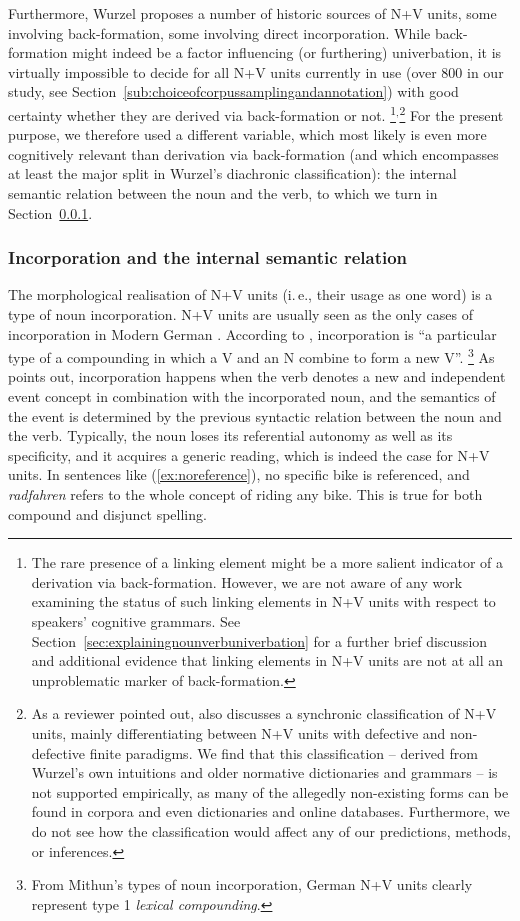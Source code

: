 \documentclass[biblatex, charis, linguex]{glossa}\usepackage{knitr}
\newcommand{\Up}[1]{\ensuremath{^{\text{#1}}}}
\begin{document}
Furthermore, Wurzel proposes a number of historic sources of N+V units, some involving back-formation, some involving direct incorporation.
While back-formation might indeed be a factor influencing (or furthering) univerbation, it is virtually impossible to decide for all N+V units currently in use (over 800 in our study, see Section~\ref{sub:choiceofcorpussamplingandannotation}) with good certainty whether they are derived via back-formation or not.%
\footnote{The rare presence of a linking element might be a more salient indicator of a derivation via back-formation.
However, we are not aware of any work examining the status of such linking elements in N+V units with respect to speakers' cognitive grammars.
See Section~\ref{sec:explainingnounverbuniverbation} for a further brief discussion and additional evidence that linking elements in N+V units are not at all an unproblematic marker of back-formation.%
}\Up{,}\footnote{%
As a reviewer pointed out, \citet{Wurzel1998} also discusses a synchronic classification of N+V units, mainly differentiating between N+V units with defective and non-defective finite paradigms.
We find that this classification -- derived from Wurzel's own intuitions and older normative dictionaries and grammars -- is not supported empirically, as many of the allegedly non-existing forms can be found in corpora and even dictionaries and online databases.
Furthermore, we do not see how the classification would affect any of our predictions, methods, or inferences.}
For the present purpose, we therefore used a different variable, which most likely is even more cognitively relevant than derivation via back-formation (and which encompasses at least the major split in Wurzel's diachronic classification): the internal semantic relation between the noun and the verb, to which we turn in Section~\ref{sub:incorporation}.

\subsubsection{Incorporation and the internal semantic relation}
\label{sub:incorporation}

The morphological realisation of N+V units (i.\,e., their usage as one word) is a type of noun incorporation.
N+V units are usually seen as the only cases of incorporation in Modern German \parencite[245]{Eisenberg2020a}.
According to \citet[848]{Mithun1984}, incorporation is ``a particular type of a compounding in which a V and an N combine to form a new V''.%
\footnote{From Mithun's types of noun incorporation, German N+V units clearly represent type 1 \textit{lexical compounding}.}
As \citet[848--849]{Mithun1984} points out, incorporation happens when the verb denotes a new and independent event concept in combination with the incorporated noun, and the semantics of the event is determined by the previous syntactic relation between the noun and the verb.
Typically, the noun loses its referential autonomy as well as its specificity, and it acquires a generic reading, which is indeed the case for N+V units.
In sentences like (\ref{ex:noreference}), no specific bike is referenced, and \textit{radfahren} refers to the whole concept of riding any bike.
This is true for both compound and disjunct spelling.
\end{document}
